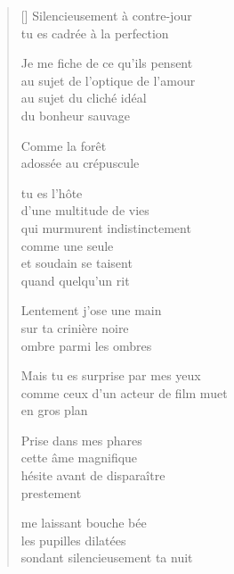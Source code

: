 \documentclass[12pt,a4paper]{article}
\begin{document}
\begin{verse}[\versewidth]
  Silencieusement à contre-jour \\
  tu es cadrée à la perfection

  Je me fiche de ce qu'ils pensent \\
  au sujet de l'optique de l'amour \\
  au sujet du cliché idéal \\
  du bonheur sauvage

  Comme la forêt \\
  adossée au crépuscule

  tu es l'hôte \\
  d'une multitude de vies \\
  qui murmurent indistinctement \\
  comme une seule \\
  et soudain se taisent \\
  quand quelqu'un rit

  Lentement j'ose une main \\
  sur ta crinière noire \\
  ombre parmi les ombres

  Mais tu es surprise par mes yeux \\
  comme ceux d'un acteur de film muet \\
  en gros plan

  Prise dans mes phares \\
  cette âme magnifique \\
  hésite avant de disparaître \\
  prestement

  me laissant bouche bée \\

  les pupilles dilatées \\
  sondant silencieusement ta nuit
\end{verse}


\newpage

\poemtitle{}

\settowidth{\versewidth}{remorqué vers sa dernière amarre}

\bigskip
\end{document}
